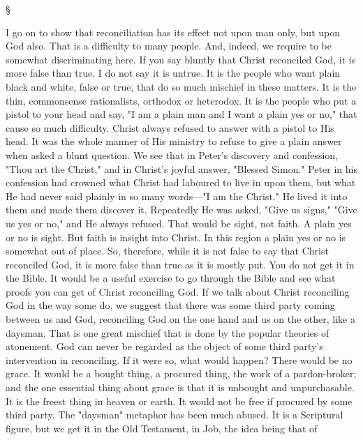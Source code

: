 \documentclass[12pt,letterpaper,oneside]{book}
\begin{document}
\begin{center}
\S
\end{center}

I go on to show that reconciliation has its 
effect not upon man only, but upon God also. 
That is a difficulty to many people. And, indeed, 
we require to be somewhat discriminating here. 
If you say bluntly that Christ reconciled God, 
it is more false than true. I do not say it 
is untrue. It is the people who want plain 
black and white, false or true, that do so much 
mischief in these matters. It is the thin, 
commonsense rationalists, orthodox or heterodox. 
It is the people who put a pistol to your 
head and say, "I am a plain man and I 
want a plain yes or no," that cause so 
much difficulty. Christ always refused to 
answer with a pistol to His head. It was the 
whole manner of His ministry to refuse to give 
a plain answer when asked a blunt question. 
We see that in Peter's discovery and confession, 
"Thou art the Christ," and in Christ's joyful 
answer, "Blessed Simon." Peter in his confession 
had crowned what Christ had laboured 
to live in upon them, but what He had never 
said plainly in so many words---"I am the 
Christ." He lived it into them and made them 
discover it. Repeatedly He was asked, "Give us 
signs," "Give us yes or no," and He always 
refused. That would be sight, not faith. A 
plain yes or no is sight. But faith is insight 
into Christ. In this region a plain yes or no 
is somewhat out of place. So, therefore, while 
it is not false to say that Christ reconciled 
God, it is more false than true as it is mostly 
put. You do not get it in the Bible. It would 
be a useful exercise to go through the Bible 
and see what proofs you can get of Christ 
reconciling God. If we talk about Christ reconciling 
God in the way some do, we suggest that 
there was some third party coming between us 
and God, reconciling God on the one hand and 
us on the other, like a daysman. That is one 
great mischief that is done by the popular 
theories of atonement. God can never be 
regarded as the object of some third party's 
intervention in reconciling. If it were so, what 
would happen? There would be no grace. It 
would be a bought thing, a procured thing, 
the work of a pardon-broker; and the one 
essential thing about grace is that it is unbought 
and unpurchasable. It is the freest 
thing in heaven or earth. It would not be 
free if procured by some third party. The 
"daysman" metaphor has been much abused. 
It is a Scriptural figure, but we get it in the 
Old Testament, in Job, the idea being that of 
\end{document}
